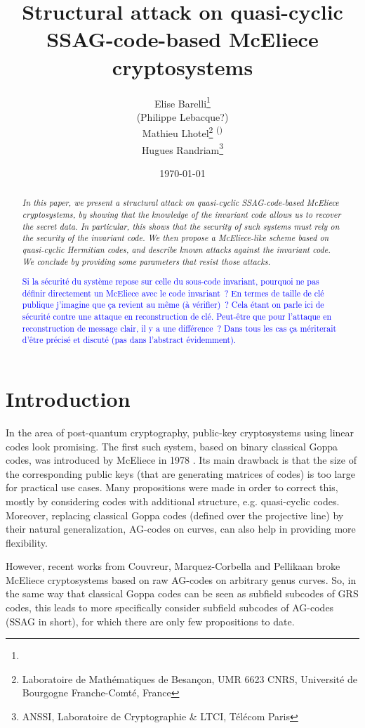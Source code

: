 \documentclass[10pt]{article}
\title{Structural attack on quasi-cyclic SSAG-code-based McEliece cryptosystems}
\author{
Elise Barelli\footnote{}\\
(Philippe Lebacque?)\\
Mathieu Lhotel\footnote{Laboratoire de Mathématiques de Besançon, UMR 6623 CNRS, Université de Bourgogne Franche-Comté, France} \textsuperscript{(\Letter)}\\
Hugues Randriam\footnote{ANSSI, Laboratoire de Cryptographie \& LTCI, Télécom Paris}
}
\date{\today}
\newcommand{\s}{\vspace{0.3cm}}
\newcommand{\hugues}[1]{\textcolor{blue}{#1}}
\begin{document}
\maketitle

\begin{abstract} 
\it In this paper, we present a structural attack on quasi-cyclic SSAG-code-based McEliece cryptosystems, by showing that the knowledge of the invariant code allows us to recover the secret data. In particular, this shows that the security of such systems must rely on the security of the invariant code. We then propose a McEliece-like scheme based on quasi-cyclic Hermitian codes, and describe known attacks against the invariant code. We conclude by providing some parameters that resist those attacks.

\hugues{
Si la sécurité du système repose sur celle du sous-code invariant, pourquoi ne pas définir directement un McEliece avec le code invariant~?
En termes de taille de clé publique j'imagine que ça revient au même (à vérifier)~?
Cela étant on parle ici de sécurité contre une attaque en reconstruction de clé.
Peut-être que pour l'attaque en reconstruction de message clair, il y a une différence~?
Dans tous les cas ça mériterait d'être précisé et discuté (pas dans l'abstract évidemment).
}
\end{abstract}

\newpage



\section{Introduction}

\s
In the area of post-quantum cryptography, public-key cryptosystems using linear codes look promising. The first such system, based on binary classical Goppa codes, was introduced by McEliece in 1978 \cite{McE}. Its main drawback is that the size of the corresponding public keys (that are generating matrices of codes) is too large for practical use cases. Many propositions were made in order to correct this, mostly by considering codes with additional structure, e.g. quasi-cyclic codes. Moreover, replacing classical Goppa codes (defined over the projective line) by their natural generalization, AG-codes on curves, can also help in providing more flexibility. 

\s

However, recent works from Couvreur, Marquez-Corbella and Pellikaan \cite{CMP} broke McEliece cryptosystems based on raw AG-codes on arbitrary genus curves. So, in the same way that classical Goppa codes can be seen as subfield subcodes of GRS codes, this leads to more specifically consider subfield subcodes of AG-codes (SSAG in short), for which there are only few propositions to date.
\end{document}
